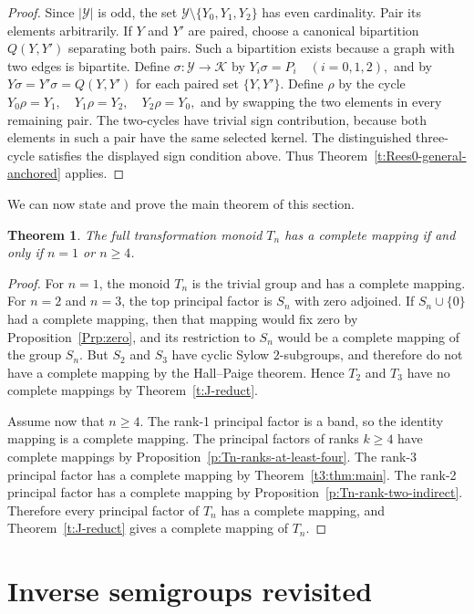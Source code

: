 \documentclass[11pt]{article}
\theoremstyle{plain}
\newtheorem{theorem}{Theorem}[section]
\theoremstyle{remark}
\theoremstyle{definition}
\theoremstyle{plain}
\begin{document}
\begin{proof}
Since $|\mathcal Y|$ is odd, the set
$\mathcal Y\setminus\{Y_0,Y_1,Y_2\}$ has even cardinality. Pair its elements
arbitrarily. If $Y$ and $Y'$ are paired, choose a canonical bipartition
$Q(Y,Y')$ separating both pairs. Such a bipartition exists because a graph
with two edges is bipartite. Define $\sigma\colon \mathcal Y\to\mathcal K$ by
\(Y_i\sigma=P_i\quad(i=0,1,2),\)
and by
\(Y\sigma=Y'\sigma=Q(Y,Y')\)
for each paired set $\{Y,Y'\}$. Define $\rho$ by the cycle
\(Y_0\rho=Y_1, \quad Y_1\rho=Y_2, \quad Y_2\rho=Y_0,\)
and by swapping the two elements in every remaining pair. The two-cycles have
trivial sign contribution, because both elements in such a pair have the same
selected kernel. The distinguished three-cycle satisfies the displayed sign
condition above. Thus Theorem~\ref{t:Rees0-general-anchored} applies.
\end{proof}

We can now state and prove the main theorem of this section.

\begin{theorem}\label{Thm:full-transformation-semigroup}
The full transformation monoid $T_n$ has a complete mapping if and only if
$n=1$ or $n\ge4$.
\end{theorem}

\begin{proof}
For $n=1$, the monoid $T_n$ is the trivial group and has a complete mapping.
For $n=2$ and $n=3$, the top principal factor is $S_n$ with zero adjoined. If
$S_n\cup\{0\}$ had a complete mapping, then that mapping would fix zero by
Proposition~\ref{Prp:zero}, and its restriction to $S_n$ would be a complete
mapping of the group $S_n$. But $S_2$ and $S_3$ have cyclic Sylow
$2$-subgroups, and therefore do not have a complete mapping by the Hall--Paige theorem. Hence $T_2$ and $T_3$ have no complete mappings by
Theorem~\ref{t:J-reduct}.

Assume now that $n\ge4$. The rank-1 principal factor is a band, so the
identity mapping is a complete mapping. The principal factors of ranks $k\ge4$
have complete mappings by Proposition~\ref{p:Tn-ranks-at-least-four}. The
rank-3 principal factor has a complete mapping by Theorem~\ref{t3:thm:main}.
The rank-2 principal factor has a complete mapping by Proposition~\ref{p:Tn-rank-two-indirect}.
Therefore every principal factor of $T_n$ has a complete mapping, and
Theorem~\ref{t:J-reduct} gives a complete mapping of $T_n$.
\end{proof}

\section{Inverse semigroups revisited}
\label{Sec:inv-revisited}
\end{document}
